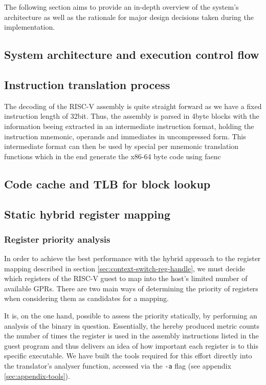 The following section aims to provide an in-depth overview of the system's architecture as well as the rationale for major design decisions taken during the implementation.

\subsection{System architecture and execution control flow}

\subsection{Instruction translation process}
The decoding of the RISC-V assembly is quite straight forward as we have a fixed instruction length of 32bit. Thus, the assembly is parsed in 4byte blocks with the information beeing extracted in an intermediate instruction format, holding the instruction mnemonic, operands and immediates in uncompressed form. This intermediate format can then be used by special per mnemonic translation functions which in the end generate the x86-64 byte code using faenc

\subsection{Code cache and TLB for block lookup}

\subsection{Static hybrid register mapping}
\subsubsection{Register priority analysis}
In order to achieve the best performance with the hybrid approach to the register mapping described in section \vref{sec:context-switch-reg-handle}, we must decide which registers of the RISC-V guest to map into the host's limited number of available GPRs.
There are two main ways of determining the priority of registers when considering them as candidates for a mapping.

It is, on the one hand, possible to assess the priority statically, by performing an analysis of the binary in question.
Essentially, the hereby produced metric counts the number of times the register is used in the assembly instructions listed in the guest program and thus delivers an idea of how important each register is to this specific executable.
We have built the tools required for this effort directly into the translator's analyser function, accessed via the \texttt{-a} flag (see appendix \ref{sec:appendix-tools}).

